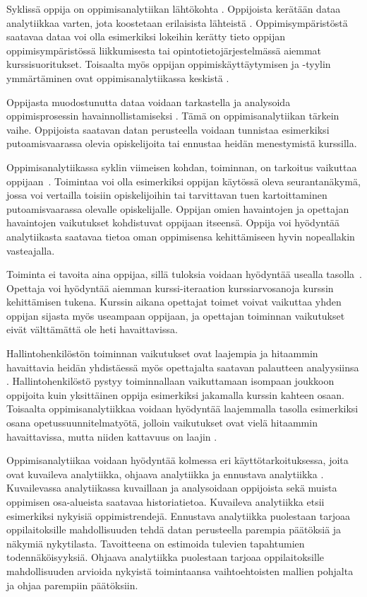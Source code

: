 Syklissä oppija on oppimisanalytiikan lähtökohta \citep{clowLearningAnalyticsCycle2012}. Oppijoista kerätään dataa analytiikkaa varten, jota koostetaan erilaisista lähteistä \citep{wolffImprovingRetentionPredicting2013}. Oppimisympäristöstä saatavaa dataa voi olla esimerkiksi lokeihin kerätty tieto oppijan oppimisympäristössä liikkumisesta tai opintotietojärjestelmässä aiemmat kurssisuoritukset. Toisaalta myös oppijan oppimiskäyttäytymisen ja -tyylin ymmärtäminen ovat oppimisanalytiikassa keskistä \citep{hasanPredictingStudentPerformance2020}.

Oppijasta muodostunutta dataa voidaan tarkastella ja analysoida oppimisprosessin havainnollistamiseksi \citep{clowLearningAnalyticsCycle2012}. Tämä on oppimisanalytiikan tärkein vaihe. Oppijoista saatavan datan perusteella voidaan tunnistaa esimerkiksi putoamisvaarassa olevia opiskelijoita tai ennustaa heidän menestymistä kurssilla.

Oppimisanalytiikassa syklin viimeisen kohdan, toiminnan, on tarkoitus vaikuttaa oppijaan~\citep{clowLearningAnalyticsCycle2012}. Toimintaa voi olla esimerkiksi oppijan käytössä oleva seurantanäkymä, jossa voi vertailla toisiin opiskelijoihin tai tarvittavan tuen kartoittaminen putoamisvaarassa olevalle opiskelijalle. Oppijan omien havaintojen ja opettajan havaintojen vaikutukset kohdistuvat oppijaan itseensä. Oppija voi hyödyntää analytiikasta saatavaa tietoa oman oppimisensa kehittämiseen hyvin nopeallakin vasteajalla.

Toiminta ei tavoita aina oppijaa, sillä tuloksia voidaan hyödyntää usealla tasolla~\citep{clowLearningAnalyticsCycle2012}. Opettaja voi hyödyntää aiemman kurssi-iteraation kurssiarvosanoja kurssin kehittämisen tukena. Kurssin aikana opettajat toimet voivat vaikuttaa yhden oppijan sijasta myös useampaan oppijaan, ja opettajan toiminnan vaikutukset eivät välttämättä ole heti havaittavissa.

Hallintohenkilöstön toiminnan vaikutukset ovat laajempia ja hitaammin havaittavia heidän yhdistäessä myös opettajalta saatavan palautteen analyysiinsa \citep{clowLearningAnalyticsCycle2012}. Hallintohenkilöstö pystyy toiminnallaan vaikuttamaan isompaan joukkoon oppijoita kuin yksittäinen oppija esimerkiksi jakamalla kurssin kahteen osaan. Toisaalta oppimisanalytiikkaa voidaan hyödyntää laajemmalla tasolla esimerkiksi osana opetussuunnitelmatyötä, jolloin vaikutukset ovat vielä hitaammin havaittavissa, mutta niiden kattavuus on laajin \citep{clowOverviewLearningAnalytics2013}.

Oppimisanalytiikaa voidaan hyödyntää kolmessa eri käyttötarkoituksessa, joita ovat kuvaileva analytiikka, ohjaava analytiikka ja ennustava analytiikka \citep{auvinenOppimisanalytiikkaTuleeOletko2017, danielBigDataAnalytics2015}. Kuvailevassa analytiikassa kuvaillaan ja analysoidaan oppijoista sekä muista oppimisen osa-alueista saatavaa historiatietoa. Kuvaileva analytiikka etsii esimerkiksi nykyisiä oppimistrendejä. Ennustava analytiikka puolestaan tarjoaa oppilaitoksille mahdollisuuden tehdä datan perusteella parempia päätöksiä ja näkymiä nykytilasta. Tavoitteena on estimoida tulevien tapahtumien todennäköisyyksiä. Ohjaava analytiikka puolestaan tarjoaa oppilaitoksille mahdollisuuden arvioida nykyistä toimintaansa vaihtoehtoisten mallien pohjalta ja ohjaa parempiin päätöksiin.